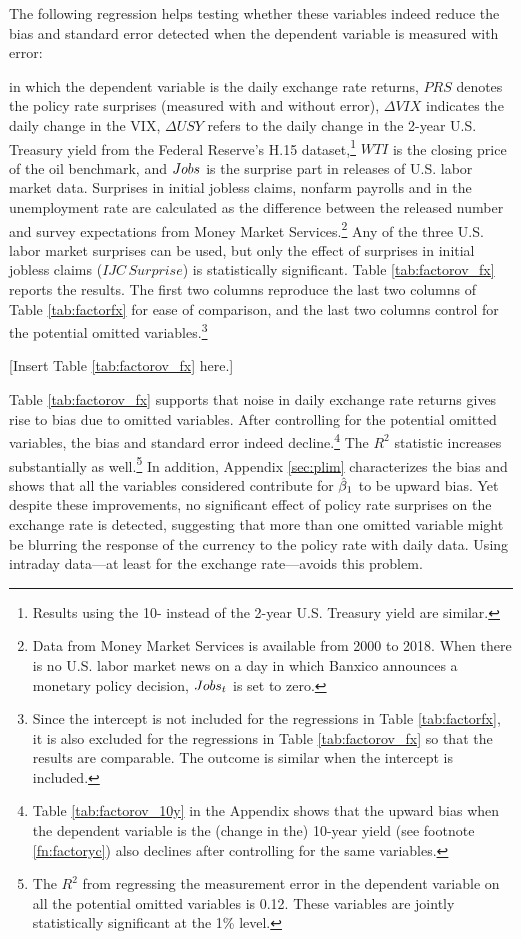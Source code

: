 \documentclass[a4paper,12pt]{article} 		%
\begin{document}
The following regression helps testing whether these variables indeed reduce the bias and standard error detected when the dependent variable is measured with error: 

in which the dependent variable is the daily exchange rate returns, \(PRS\) denotes the policy rate surprises (measured with and without error), \(\Delta VIX\) indicates the daily change in the VIX, \(\Delta USY\) refers to the daily change in the 2-year U.S. Treasury yield from the Federal Reserve's H.15 dataset,\footnote{Results using the 10- instead of the 2-year U.S. Treasury yield are similar.} \(WTI\) is the closing price of the oil benchmark, and \(Jobs\) is the surprise part in releases of U.S. labor market data. Surprises in initial jobless claims, nonfarm payrolls and in the unemployment rate are calculated as the difference between the released number and survey expectations from Money Market Services.\footnote{Data from Money Market Services is available from 2000 to 2018. When there is no U.S. labor market news on a day in which Banxico announces a monetary policy decision, \(Jobs_{t}\) is set to zero.} Any of the three U.S. labor market surprises can be used, but only the effect of surprises in initial jobless claims (\(IJC \, Surprise\)) is statistically significant. Table \ref{tab:factorov_fx} reports the results. 
The first two columns reproduce the last two columns of Table \ref{tab:factorfx} for ease of comparison, and the last two columns control for the potential omitted variables.\footnote{Since the intercept is not included for the regressions in Table \ref{tab:factorfx}, it is also excluded for the regressions in Table \ref{tab:factorov_fx} so that the results are comparable. The outcome is similar when the intercept is included.}
\begin{center}
	[Insert Table \ref{tab:factorov_fx} here.]
\end{center}

Table \ref{tab:factorov_fx} supports that noise in daily exchange rate returns gives rise to bias due to omitted variables. After controlling for the potential omitted variables, the bias and standard error indeed decline.\footnote{Table \ref{tab:factorov_10y} in the Appendix shows that the upward bias when the dependent variable is the (change in the) 10-year yield (see footnote \ref{fn:factoryc}) also declines after controlling for the same variables.} The \(R^2\) statistic increases substantially as well.\footnote{The \(R^2\) from regressing the measurement error in the dependent variable on all the potential omitted variables is 0.12. These variables are jointly statistically significant at the 1\% level.} In addition, Appendix \ref{sec:plim} characterizes the bias and shows that all the variables considered contribute for \(\hat{\beta}_{1}\) to be upward bias. Yet despite these improvements, no significant effect of policy rate surprises on the exchange rate is detected, suggesting that more than one omitted variable might be blurring the response of the currency to the policy rate with daily data. Using intraday data---at least for the exchange rate---avoids this problem.
\end{document}
